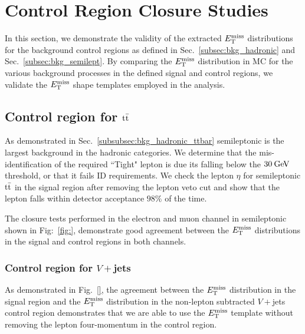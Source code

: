 \section{Control Region Closure Studies}
\label{app:CR}

In this section, we demonstrate the validity of the extracted $E_\mathrm{T}^{\mathrm{miss}}$ distributions for the background control regions as defined in Sec.~\ref{subsec:bkg_hadronic} and Sec.~\ref{subsec:bkg_semilept}. By comparing the $E_\mathrm{T}^{\mathrm{miss}}$ distribution in MC for the various background processes in the defined signal and control regions, we validate the $E_\mathrm{T}^{\mathrm{miss}}$ shape templates employed in the analysis.

\subsection{Control region for \texorpdfstring{$\mathrm{t}\bar{\mathrm{t}}$}{ttbar}}
\label{app:CRttbar}

As demonstrated in Sec.~\ref{subsubsec:bkg_hadronic_ttbar} semileptonic \ttbar\: is the largest background in the hadronic categories. We determine that the mis-identification of the required ``Tight" lepton is due its \pt falling below the $30\:\mathrm{Ge\kern -0.1em V}\:$ threshold, or that it fails ID requirements. We check the lepton $\eta$ for semileptonic $\mathrm{t}\bar{\mathrm{t}}$ in the signal region after removing the lepton veto cut and show that the lepton falls within detector acceptance $98\%$ of the time.

\iffalse
\begin{figure}
\centering
\texttt{[image: figure: ]}

\caption{}


\end{figure}
\fi

The closure tests performed in the electron and muon channel in semileptonic \ttbar\: shown in Fig:~\ref{fig:}, demonstrate good agreement between the $E_\mathrm{T}^{\mathrm{miss}}$ distributions in the signal and control regions in both channels. 

\subsubsection{Control region for \texorpdfstring{$V+$jets}{Vjets}}
\label{app:CRZjets}

As demonstrated in Fig.~\ref{}, the agreement between the $E_\mathrm{T}^{\mathrm{miss}}$ distribution in the signal region and the $E_\mathrm{T}^{\mathrm{miss}}$ distribution in the non-lepton subtracted $V+$jets control region demonstrates that we are able to use the $E_\mathrm{T}^{\mathrm{miss}}$ template without removing the lepton four-momentum in the control region.


\iffalse
\begin{figure}
\centering
\texttt{[image: figure: ]}

\caption{}


\end{figure}
\fi
